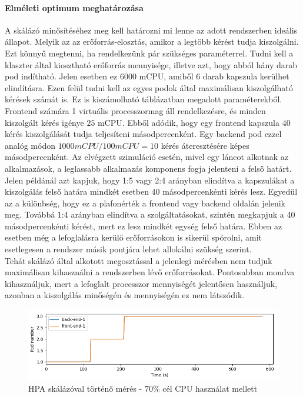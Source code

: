 \paragraph{Elméleti optimum meghatározása} 
A skálázó minősítéséhez meg kell határozni mi lenne az adott rendszerben ideális állapot.
Melyik az az erőforrás-elosztás, amikor a legtöbb kérést tudja kiszolgálni.
Ezt könnyű megtenni, ha rendelkezünk pár szükséges paraméterrel.
Tudni kell a klaszter által kiosztható erőforrás mennyisége, illetve azt, hogy abból hány darab pod indítható. Jelen esetben ez $6000$ mCPU, amiből $6$ darab kapszula kerülhet elindításra.
Ezen felül tudni kell az egyes podok által maximálisan kiszolgálható kérések számát is. 
Ez is kiszámolható  táblázatban megadott paraméterekből. 
Frontend számára 1 virtuális processzormag áll rendelkezésre, és minden kiszolgált kérés igénye $25$ mCPU.
Ebből adódik, hogy egy frontend kapszula $40$ kérés kiszolgálását tudja teljesíteni másodpercenként. 
Egy backend pod ezzel analóg módon $1000mCPU / 100mCPU = 10$ kérés áteresztésére képes másodpercenként.
Az elvégzett szimuláció esetén, mivel egy láncot alkotnak az alkalmazások, a leglassabb alkalmazás komponens fogja jelenteni a felső határt.
Jelen példánál azt kapjuk, hogy 1:5 vagy 2:4 arányban elindítva a kapszulákat a kiszolgálás felső határa mindkét esetben $40$ másodpercenkénti kérés lesz.
Egyedül az a különbség, hogy ez a plafonérték a frontend vagy backend oldalán jelenik meg.
Továbbá 1:4 arányban elindítva a szolgáltatásokat, szintén megkapjuk a 40 másodpercenkénti kérést, mert ez lesz mindkét egység felső határa. 
Ebben az esetben még a lefoglalásra kerülő erőforrásokon is sikerül spórolni, amit esetlegesen a rendszer másik pontjára lehet allokálni szükség szerint. \\

Tehát skálázó által alkotott megosztással a jelenlegi mérésben nem tudjuk maximálisan kihasználni a rendszerben lévő erőforrásokat.
Pontosabban mondva kihasználjuk, mert a lefoglalt processzor mennyiségét jelentősen használjuk, azonban a kiszolgálás minőségén és mennyiségén ez nem látszódik.

\begin{figure}[!ht]
	\centering
	\includegraphics[width=150mm, keepaspectratio]{figures/HPA-scaling-in-the-same-time_label.png}
	\caption{HPA skálázóval történő mérés - 70\% cél CPU használat mellett}
	\label{fig:HPA-scaling-same-time}
\end{figure}

